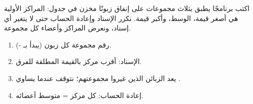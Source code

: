 \begin{statement}
اكتب برنامجًا يطبق \textbf{} بثلاث مجموعات على إنفاق  زبونًا مخزن في جدول: المراكز الأولية هي أصغر قيمة، الوسط، وأكبر قيمة. نكرر الإسناد وإعادة الحساب حتى لا يتغير أي إسناد، ونعرض المراكز وأعضاء كل مجموعة.
\end{statement}
\begin{stepsbox}\begin{enumerate}
\item {} رقم مجموعة كل زبون (يبدأ بـ -).
\item الإسناد: أقرب مركز بالقيمة المطلقة للفرق.
\item {} يعد الزبائن الذين غيروا مجموعتهم؛ نتوقف عندما يساوي .
\item إعادة الحساب: كل مركز = متوسط أعضائه.
\end{enumerate}\end{stepsbox}
